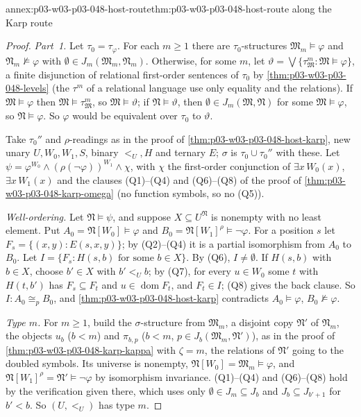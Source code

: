 \begin{annexitem}{annex:p03-w03-p03-048-host-route}{thm:p03-w03-p03-048-host-route}{ along the Karp route}
\begin{proof}
\emph{Part~1.}  Let \(\tau_0=\tau_\varphi\).  For each \(m\geq1\) there are
\(\tau_0\)-structures \(\mathfrak M_m\models\varphi\) and \(\mathfrak N_m
\not\models\varphi\) with \(\emptyset\in J_m(\mathfrak M_m,\mathfrak N_m)\).
Otherwise, for some \(m\), let \(\vartheta=\bigvee\{\tau^{m}_{\mathfrak M}:
\mathfrak M\models\varphi\}\), a finite disjunction of relational first-order
sentences of \(\tau_0\) by \cref{thm:p03-w03-p03-048-levels} (the
\(\tau^{m}\) of a relational language use only equality and the relations).
If \(\mathfrak M\models\varphi\) then \(\mathfrak M\models\tau^m_{\mathfrak M}\),
so \(\mathfrak M\models\vartheta\); if \(\mathfrak N\models\vartheta\), then
\(\emptyset\in J_m(\mathfrak M,\mathfrak N)\) for some
\(\mathfrak M\models\varphi\), so \(\mathfrak N\models\varphi\).  So
\(\varphi\) would be equivalent over \(\tau_0\) to \(\vartheta\).

Take \(\tau_0''\) and \(\rho\)-readings as in the proof of
\cref{thm:p03-w03-p03-048-host-karp}, new unary \(U,W_0,W_1,S\), binary
\(<_U,H\) and ternary \(E\); \(\sigma\) is \(\tau_0\cup\tau_0''\) with these.
Let \(\psi=\varphi^{W_0}\land(\rho(\neg\varphi))^{W_1}\land\chi\), with
\(\chi\) the first-order conjunction of \(\exists x\,W_0(x)\),
\(\exists x\,W_1(x)\) and the clauses (Q1)--(Q4) and (Q6)--(Q8) of the proof
of \cref{thm:p03-w03-p03-048-karp-omega} (no function symbols, so no (Q5)).

\emph{Well-ordering.}  Let \(\mathfrak N\models\psi\), and suppose
\(X\subseteq U^{\mathfrak N}\) is nonempty with no least element.  Put
\(A_0=\mathfrak N[W_0]\models\varphi\) and \(B_0=\mathfrak
N[W_1]^{\rho}\models\neg\varphi\).  For a position \(s\) let
\(F_s=\{(x,y):E(s,x,y)\}\); by (Q2)--(Q4) it is a partial isomorphism from
\(A_0\) to \(B_0\).  Let \(I=\{F_s:H(s,b)\text{ for some }b\in X\}\).  By
(Q6), \(I\neq\emptyset\).  If \(H(s,b)\) with \(b\in X\), choose \(b'\in X\)
with \(b'<_Ub\); by (Q7), for every \(u\in W_0\) some \(t\) with
\(H(t,b')\) has \(F_s\subseteq F_t\) and \(u\in\operatorname{dom}F_t\), and
\(F_t\in I\); (Q8) gives the back clause.  So \(I:A_0\cong_pB_0\), and
\cref{thm:p03-w03-p03-048-host-karp} contradicts \(A_0\models\varphi\),
\(B_0\not\models\varphi\).

\emph{Type \(m\).}  For \(m\geq1\), build the \(\sigma\)-structure from
\(\mathfrak M_m\), a disjoint copy \(\mathfrak N'\) of \(\mathfrak N_m\), the
objects \(u_b\) (\(b<m\)) and \(\pi_{b,p}\) (\(b<m\), \(p\in
J_b(\mathfrak M_m,\mathfrak N')\)), as in the proof of
\cref{thm:p03-w03-p03-048-karp-kappa} with \(\zeta=m\), the relations of
\(\mathfrak N'\) going to the doubled symbols.  Its universe is nonempty,
\(\mathfrak N[W_0]=\mathfrak M_m\models\varphi\), and \(\mathfrak N[W_1]^{\rho}
=\mathfrak N'\models\neg\varphi\) by isomorphism invariance.  (Q1)--(Q4) and
(Q6)--(Q8) hold by the verification given there, which uses only
\(\emptyset\in J_m\subseteq J_b\) and \(J_b\subseteq J_{b'+1}\) for
\(b'<b\).  So \((U,<_U)\) has type \(m\).


\end{proof}
\end{annexitem}
